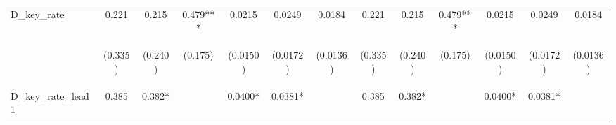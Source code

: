 \documentclass[]{article}
\begin{document}
\begin{center}
\begin{tabular}{lcccccccccccc}
D\_key\_rate & 0.221 & 0.215 & 0.479*** & 0.0215 & 0.0249 & 0.0184 & 0.221 & 0.215 & 0.479*** & 0.0215 & 0.0249 & 0.0184 \\
\vspace{4pt} & \begin{footnotesize}(0.335)\end{footnotesize} & \begin{footnotesize}(0.240)\end{footnotesize} & \begin{footnotesize}(0.175)\end{footnotesize} & \begin{footnotesize}(0.0150)\end{footnotesize} & \begin{footnotesize}(0.0172)\end{footnotesize} & \begin{footnotesize}(0.0136)\end{footnotesize} & \begin{footnotesize}(0.335)\end{footnotesize} & \begin{footnotesize}(0.240)\end{footnotesize} & \begin{footnotesize}(0.175)\end{footnotesize} & \begin{footnotesize}(0.0150)\end{footnotesize} & \begin{footnotesize}(0.0172)\end{footnotesize} & \begin{footnotesize}(0.0136)\end{footnotesize} \\
D\_key\_rate\_lead1 & 0.385 & 0.382* &  & 0.0400* & 0.0381* &  & 0.385 & 0.382* &  & 0.0400* & 0.0381* &  \\

\end{tabular}
\end{center}
\end{document}
